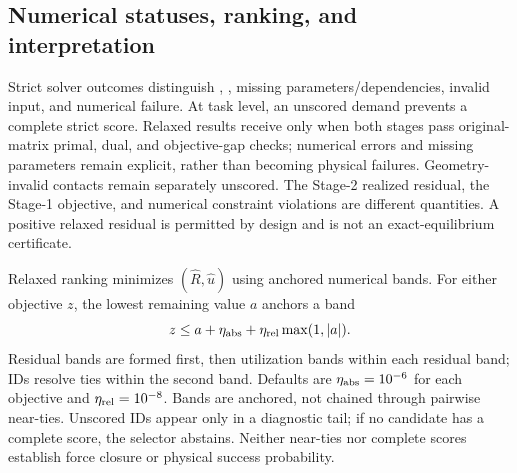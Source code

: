 \documentclass{article}
\begin{document}
\subsection{Numerical statuses, ranking, and interpretation}
Strict solver outcomes distinguish , , missing parameters/dependencies, invalid input, and numerical failure. At task level, an unscored demand prevents a complete strict score. Relaxed results receive  only when both stages pass original-matrix primal, dual, and objective-gap checks; numerical errors and missing parameters remain explicit, rather than becoming physical failures. Geometry-invalid contacts remain separately unscored. The Stage-2 realized residual, the Stage-1 objective, and numerical constraint violations are different quantities. A positive relaxed residual is permitted by design and is not an exact-equilibrium certificate.

Relaxed ranking minimizes $(\widehat R,\widehat u)$ using anchored numerical bands. For either objective $z$, the lowest remaining value $a$ anchors a band
\begin{equation}
 z\le a+\eta_{\rm abs}+\eta_{\rm rel}\max(1,|a|).
\label{eq:bands}
\end{equation}
Residual bands are formed first, then utilization bands within each residual band; IDs resolve ties within the second band. Defaults are $\eta_{\rm abs}=10^{-6}$ for each objective and $\eta_{\rm rel}=10^{-8}$. Bands are anchored, not chained through pairwise near-ties. Unscored IDs appear only in a diagnostic tail; if no candidate has a complete score, the selector abstains. Neither near-ties nor complete scores establish force closure or physical success probability.
\end{document}
